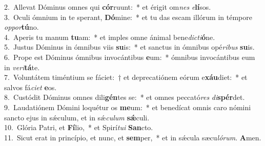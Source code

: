 {2.~}Allevat Dóminus omnes qui \textbf{cór}ruunt:~* et érigit om\textit{nes} \textit{e}\textbf{lí}sos.\\
{3.~}Oculi ómnium in te sperant, \textbf{Dó}mine:~* et tu das escam illórum in témpore \textit{op}\textit{por}\textbf{tú}no.\\
{4.~}Aperis tu manum \textbf{tu}am:~* et imples omne ánimal bene\textit{di}\textit{cti}\textbf{ó}ne.\\
{5.~}Justus Dóminus in ómnibus viis \textbf{su}is:~* et sanctus in ómnibus opé\textit{ri}\textit{bus} \textbf{su}is.\\
{6.~}Prope est Dóminus ómnibus invocántibus \textbf{e}um:~* ómnibus invocántibus eum in \textit{ve}\textit{ri}\textbf{tá}te.\\
{7.~}Voluntátem timéntium se fáciet:~† et deprecatiónem eórum e\textbf{xáu}diet:~* et salvos fá\textit{ci}\textit{et} \textbf{e}os.\\
{8.~}Custódit Dóminus omnes dili\textbf{gén}tes se:~* et omnes peccató\textit{res} \textit{di}\textbf{spér}det.\\
{9.~}Laudatiónem Dómini loquétur os \textbf{me}um:~* et benedícat omnis caro nómini sancto ejus in sǽculum, et in sǽ\textit{cu}\textit{lum} \textbf{sǽ}culi.\\
{10.~}Glória Patri, et \textbf{Fí}lio,~* et Spirí\textit{tu}\textit{i} \textbf{San}cto.\\
{11.~}Sicut erat in princípio, et nunc, et \textbf{sem}per,~* et in sǽcula sæcu\textit{ló}\textit{rum}. \textbf{A}men.\\

